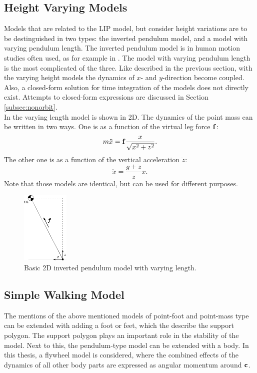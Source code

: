 \subsection{Height Varying Models}
Models that are related to the \ac{LIP} model, but consider height variations are to be destinguished in two types: the inverted pendulum model, and a model with varying pendulum length. The inverted pendulum model is in human motion studies often used, as for example in \cite{kuo2005energetic}. The model with varying pendulum length is the most complicated of the three. Like described in the previous section, with the varying height models the dynamics of $x$- and $y$-direction become coupled. Also, a closed-form solution for time integration of the models does not directly exist. Attempts to closed-form expressions are discussed in Section \ref{subsec:nonorbit}. \\
In  the varying length model is shown in \ac{2D}. The dynamics of the point mass can be written in two ways. One is as a function of the virtual leg force $\mathbf{f}$:
\begin{equation}
	m\ddot{x} = \mathbf{f}\frac{x}{\sqrt{x^2 + z^2}}.
	\label{eq:dynamicsprattstyle}
\end{equation}
The other one is as a function of the vertical acceleration $\ddot{z}$:
\begin{equation}
	\ddot{x} = \frac{g+\ddot{z}}{z}x.
	\label{eq:dynamicscaronstyle}
\end{equation}
Note that those models are identical, but can be used for different purposes.
\begin{figure}[h]
\centering
\includegraphics[width=0.2\textwidth]{STYLESTUFF/2Dnonlin.png}
\caption{Basic \ac{2D} inverted pendulum model with varying length.}
\label{fig:2Dnonlinmodel}
\end{figure}
\subsection{Simple Walking Model}
The mentions of the above mentioned models of point-foot and point-mass type can be extended with adding a foot or feet, which the describe the support polygon. The support polygon plays an important role in the stability of the model. Next to this, the pendulum-type model can be extended with a body. In this thesis, a flywheel model is considered, where the combined effects of the dynamics of all other body parts are expressed as angular momentum around $\mathbf{c}$.


